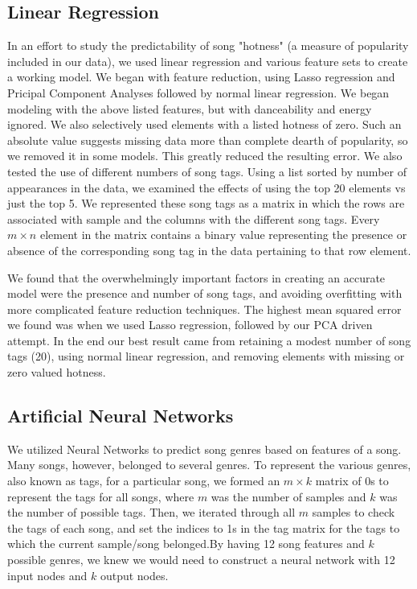 \documentclass[12pt]{article}
\begin{document}
\subsection{Linear Regression}
\label{subsec:linearRegression}
In an effort to study the predictability of song "hotness" (a measure of popularity included in our data), we used linear regression and various feature sets to create a working model. We began with feature reduction, using Lasso regression and Pricipal Component Analyses followed by normal linear regression. We began modeling with the above listed features, but with danceability and energy ignored. We also selectively used elements with a listed hotness of zero. Such an absolute value suggests missing data more than complete dearth of popularity, so we removed it in some models. This greatly reduced the resulting error. We also tested the use of different numbers of song tags. Using a list sorted by number of appearances in the data, we examined the effects of using the top 20 elements vs just the top 5. We represented these song tags as a matrix in which the rows are associated with sample and the columns with the different song tags. Every $m \times n$ element in the matrix contains a binary value representing the presence or absence of the corresponding song tag in the data pertaining to that row element.

We found that the overwhelmingly important factors in creating an accurate model were the presence and number of song tags, and avoiding overfitting with more complicated feature reduction techniques. The highest mean squared error we found was when we used Lasso regression, followed by our PCA driven attempt. In the end our best result came from retaining a modest number of song tags (20), using normal linear regression, and removing elements with missing or zero valued hotness.
\subsection{Artificial Neural Networks}
\label{subsec:ann}
We utilized Neural Networks to predict song genres based on features of a song. Many songs, however, belonged to several genres. To represent the various genres, also known as tags, for a particular song, we formed an $m \times k$ matrix of 0s to represent the tags for all songs, where $m$ was the number of samples and $k$ was the number of possible tags. Then, we iterated through all $m$ samples to check the tags of each song, and set the indices to 1s in the tag matrix for the tags to which the current sample/song belonged.By having 12 song features and $k$ possible genres, we knew we would need to construct a neural network with 12 input nodes and $k$ output nodes. 
\end{document}
